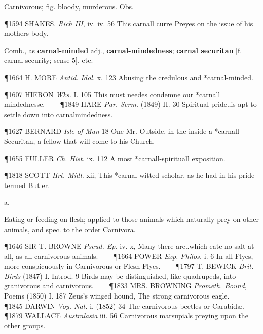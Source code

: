 \begin{description}[wide, labelwidth=!, labelindent=0pt]
\begin{myenumerate}
 Carnivorous; fig. bloody, murderous. Obs.

\P 1594 SHAKES.  \textit{Rich III}, iv. iv. 56 This carnall curre Preyes on the issue of his mothers body.

 Comb., as \textbf{carnal-minded} adj., \textbf{carnal-mindedness};
\textbf{carnal securitan} [f. carnal security; sense 5], etc.

\P 1664 H. MORE  \textit{Antid. Idol.} x. 123 Abusing the credulous and *carnal-minded.

\P 1607 HIERON  \textit{Wks.} I. 105 This must needes condemne our *carnall mindednesse.    
\P 1849 HARE  \textit{Par. Serm.} (1849) II. 30 Spiritual pride‥is apt to settle down into carnalmindedness.

\P 1627 BERNARD  \textit{Isle of Man} 18 One Mr. Outside, in the inside a *carnall Securitan, a fellow that will come to his Church.

\P 1655 FULLER  \textit{Ch. Hist.} ix. 112 A most *carnall-spirituall exposition.

\P 1818 SCOTT  \textit{Hrt. Midl.} xii, This *carnal-witted scholar, as he had in his pride termed Butler.
\end{myenumerate}


 a.

\noindent {}

\vspace{-0.3cm}

\begin{myenumerate}

 Eating or feeding on flesh; applied to those animals which naturally prey on other animals, and spec. to the order Carnivora.

\P 1646 SIR T. BROWNE  \textit{Pseud. Ep.} iv. x, Many there are‥which eate no salt at all, as all carnivorous animals.    
\P 1664 POWER  \textit{Exp. Philos.} i. 6 In all Flyes, more conspicuously in Carnivorous or Flesh-Flyes.    
\P 1797 T. BEWICK  \textit{Brit. Birds} (1847) I. Introd. 9 Birds may be distinguished, like quadrupeds, into granivorous and carnivorous.    
\P 1833 MRS. BROWNING  \textit{Prometh. Bound}, Poems (1850) I. 187 Zeus's winged hound, The strong carnivorous eagle.    
\P 1845 DARWIN  \textit{Voy. Nat.} i. (1852) 34 The carnivorous beetles or Carabidæ.    
\P 1879 WALLACE  \textit{Australasia} iii. 56 Carnivorous marsupials preying upon the other groups.


\end{myenumerate}
\end{description}
